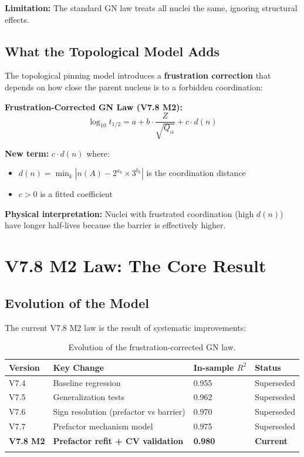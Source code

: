 \documentclass[11pt,a4paper]{article}
\begin{document}
\textbf{Limitation:} The standard GN law treats all nuclei the same, ignoring structural effects.

\subsection{What the Topological Model Adds}

The topological pinning model introduces a \textbf{frustration correction} that depends on how close the parent nucleus is to a forbidden coordination:

\begin{derivbox}
\textbf{Frustration-Corrected GN Law (V7.8 M2):}
\begin{equation}
    \log_{10} t_{1/2} = a + b \cdot \frac{Z}{\sqrt{Q_\alpha}} + c \cdot d(n)
    \label{eq:gn_corrected}
\end{equation}

\textbf{New term:} $c \cdot d(n)$ where:
\begin{itemize}[nosep]
    \item $d(n) = \min_k |n(A) - 2^{a_k} \times 3^{b_k}|$ is the coordination distance
    \item $c > 0$ is a fitted coefficient
\end{itemize}

\textbf{Physical interpretation:} Nuclei with frustrated coordination (high $d(n)$) have longer half-lives because the barrier is effectively higher.
\end{derivbox}

\section{V7.8 M2 Law: The Core Result}
\label{sec:v78_m2}

\subsection{Evolution of the Model}

The current V7.8 M2 law is the result of systematic improvements:

\begin{longtable}{llll}
\toprule
\textbf{Version} & \textbf{Key Change} & \textbf{In-sample $R^2$} & \textbf{Status} \\
\midrule
\endhead
V7.4 & Baseline regression & 0.955 & Superseded \\
V7.5 & Generalization tests & 0.962 & Superseded \\
V7.6 & Sign resolution (prefactor vs barrier) & 0.970 & Superseded \\
V7.7 & Prefactor mechanism model & 0.975 & Superseded \\
\textbf{V7.8 M2} & \textbf{Prefactor refit + CV validation} & \textbf{0.980} & \textbf{Current} \\
\bottomrule
\caption{Evolution of the frustration-corrected GN law.}
\end{longtable}
\end{document}
